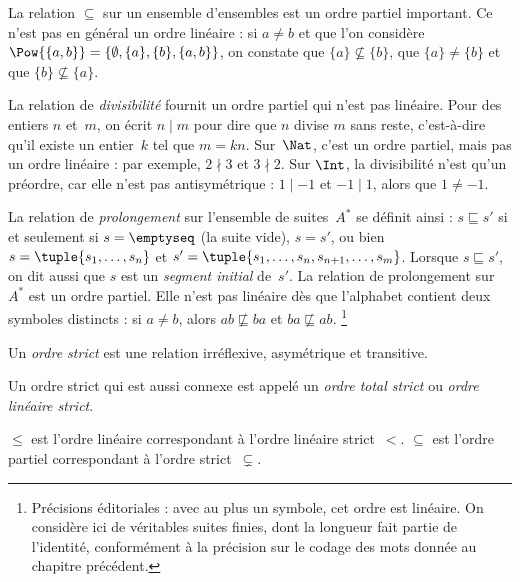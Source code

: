\documentclass[11pt,a4paper,openany]{memoir}
\begin{document}
\begin{ex}
La relation $\subseteq$ sur un ensemble d’ensembles est un ordre partiel
important. Ce n’est pas en général un ordre linéaire : si $a \neq b$ et
que l’on considère $\Pow{\{a, b\}} = \{\emptyset, \{a\}, \{b\}, \{a,b\}\}$,
on constate que $\{a\} \nsubseteq \{b\}$, que $\{a\} \neq \{b\}$ et que
$\{b\} \nsubseteq \{a\}$.
\end{ex}

\begin{ex}
La relation de \emph{divisibilité} fournit un ordre partiel qui n’est pas
linéaire. Pour des entiers $n$ et~$m$, on écrit $n \mid m$ pour dire que
$n$ divise $m$ sans reste, c’est-à-dire qu’il existe un entier~$k$ tel que
$m = kn$. Sur~$\Nat$, c’est un ordre partiel, mais pas un ordre linéaire :
par exemple, $2 \nmid 3$ et $3 \nmid 2$. Sur $\Int$, la divisibilité
n’est qu’un préordre, car elle n’est pas antisymétrique : $1 \mid -1$ et
$-1 \mid 1$, alors que $1 \neq -1$.
\end{ex}

\begin{ex}
La relation de \emph{prolongement} sur l’ensemble de suites~$A^*$ se
définit ainsi : $s \sqsubseteq s'$ si et seulement si $s = \emptyseq$
(la suite vide), $s = s'$, ou bien $s = \tuple{s_1, \dots, s_n}$ et
$s' = \tuple{s_1, \dots, s_n, s_{n+1}, \dots, s_m}$.
Lorsque $s \sqsubseteq s'$, on dit aussi que $s$ est un \emph{segment initial}
de~$s'$. La relation de prolongement sur $A^*$ est un ordre partiel.
Elle n’est pas linéaire dès que l’alphabet contient deux symboles distincts :
si $a \neq b$, alors $ab \not\sqsubseteq ba$ et $ba \not\sqsubseteq ab$.
\footnote{Précisions éditoriales : avec au plus un symbole, cet ordre est
linéaire. On considère ici de véritables suites finies, dont la longueur
fait partie de l’identité, conformément à la précision sur le codage des
mots donnée au chapitre précédent.}
\end{ex}

\begin{defn}
Un \emph{ordre strict} est une relation irréflexive, asymétrique et transitive.
\end{defn}

\begin{defn}
Un ordre strict qui est aussi connexe est appelé un \emph{ordre total strict}
ou \emph{ordre linéaire strict}.
\end{defn}

\begin{ex}
$\le$ est l’ordre linéaire correspondant à l’ordre linéaire strict~$<$.
$\subseteq$ est l’ordre partiel correspondant à l’ordre strict~$\subsetneq$.
\end{ex}
\end{document}
